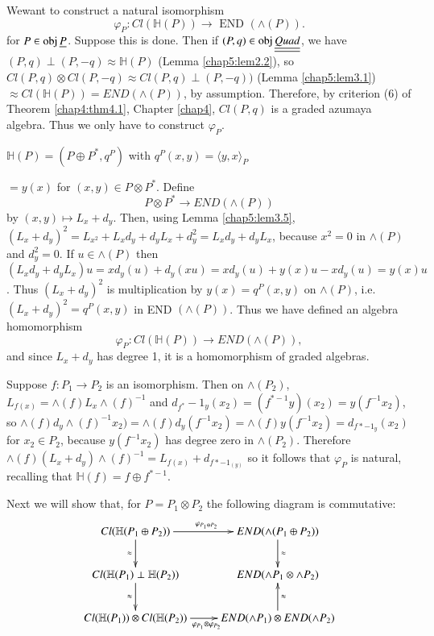 \setcounter{proofof}{8}
\begin{proofof}%
We\pageoriginale want to construct a natural isomorphism
$$
\varphi_P : Cl (\mathbb{H} (P)) \to \text{ END } (\wedge (P)). 
$$
for $P \in  \operatorname{obj} \underline{P}$. Suppose this is done. Then if
$(P, q) \in \operatorname{obj} \underline{\underline{Quad}}$, we have $(P, q) \perp (P, -q)
\approx \mathbb{H} (P)$ (Lemma \ref{chap5:lem2.2}), so $Cl(P, q)
\otimes Cl (P, -q) 
\approx Cl(P, q) \perp (P, -q))$ (Lemma \ref{chap5:lem3.1}) $\approx
Cl (\mathbb{H} 
(P)) = END (\wedge(P))$, by assumption. Therefore, by criterion (6)
of Theorem \ref{chap4:thm4.1}, Chapter \ref{chap4}, $Cl(P, q)$ is a
graded azumaya algebra. Thus we only have to construct $\varphi_P$.  

$\mathbb{H}(P) = (P \oplus P^\ast, q^P)$ with $q^P (x, y) = \langle
y, x \rangle_P$
 
\noindent
$= y(x)$ for $(x, y) \in P \otimes P^\ast$. Define 
$$
P \otimes P^\ast \to END (\wedge (P))
$$
by $(x, y) \mapsto L_x + d_y$. Then, using Lemma \ref{chap5:lem3.5},
$(L_x + d_y)^2 = L_{x^2} + L_x d_y + d_y L_x + d^2_y = L_x d_y + d_y L_x$,
because $x^2 = 0$ in $\wedge (P)$ and $d^2_y = 0$. If $u \in \wedge
(P)$ then $(L_x d_y + d_y L_x) u = xd_y (u) + d_y (xu) = xd_y (u) + y
(x) u - x d_y(u) = y(x) u$. Thus $(L_x + d_y)^2$ is multiplication by
$y (x) = q^P (x, y)$ on $\wedge (P)$, i.e. $(L_x + d_y)^2 = q^P (x,
y)$ in END $(\wedge (P))$. Thus we have defined an algebra
homomorphism   
$$
\varphi_P : Cl (\mathbb{H} (P)) \to END (\wedge (P)),
$$
and since $L_x + d_y$ has degree 1, it is a homomorphism of graded
algebras. 

Suppose $f: P_1 \to P_2$ is an isomorphism. Then on $\wedge (P_2)$,
$L_{f(x)} = \wedge (f) L_x \wedge(f)^{-1}$ and $d_{f^\ast}-1_y (x_2) =
(f^{*-1}y) (x_2) = y (f^{-1} x_2)$, so $\wedge (f) d_y \wedge (f)^{-1}
x_2) = \wedge (f) d_y (f^{-1} x_2) = \wedge (f) y (f^{-1} x_2) = d_{f*
  -1_y} (x_2)$ for $x_2 \in P_2$, because $y(f^{-1} x_2)$ 
has degree zero in $\wedge (P_2)$. Therefore\pageoriginale $\wedge (f)
(L_x + d_y) \wedge (f)^{-1} = L_{f(x)} + d_{f*-1_{(y)}}$ so it follows
that $\varphi_P$ is natural, recalling that $\mathbb{H} (f) = f \oplus
f^{*-1}$.  

Next we will show that, for $P = P_1 \otimes P_2$ the following
diagram is commutative:  
\[
\xymatrix{
Cl (\mathbb{H} (P_1 \oplus P_2)) \ar[r]^{\varphi_{P_1 \oplus P_2}} 
\ar[d]_{\approx}  & END (\wedge (P_1 \oplus P_2)) \ar[d]^{\approx}\\
Cl (\mathbb{H} (P_1) \perp \mathbb{H} (P_2)) \ar[d]_{\approx}& END
(\wedge P_1 \otimes \wedge P_2)\\
Cl (\mathbb{H} (P_1)) \otimes Cl (\mathbb{H} (P_2))
\ar[r]_{\varphi_{P_1} \otimes \varphi_{P_2}} & END (\wedge P_1)
\otimes END (\wedge P_2) \ar[u]_{\approx}
}
\]


\end{proofof}
